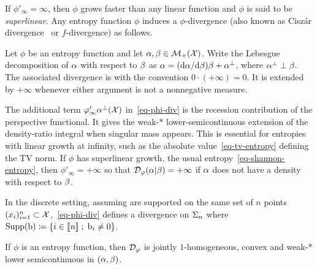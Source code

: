 If $\phi'_\infty = \infty$, then $\phi$ grows faster than any linear function and $\phi$ is said to be \emph{superlinear}. Any entropy function $\phi$ induces a $\phi$-divergence (also known as Cisz\'ar divergence~\cite{ciszar1967information,ali1966general} or $f$-divergence) as follows.

\begin{defn}
\label{def_divergence}
Let $\phi$ be an entropy function and let $\alpha,\beta\in\mathcal{M}_+(\mathcal{X})$. Write the Lebesgue decomposition of $\alpha$ with respect to $\beta$ as
$\alpha=(\mathrm{d}\alpha/\mathrm{d}\beta)\beta+\alpha^\perp$, where $\alpha^\perp\perp\beta$. The associated divergence is
with the convention $0\cdot(+\infty)=0$. It is extended by $+\infty$ whenever either argument is not a nonnegative measure.
\end{defn}%

The additional term $\varphi'_\infty \alpha^{\perp}(\mathcal{X})$ in~\eqref{eq-phi-div} is the recession contribution of the perspective functional. It gives the weak-* lower-semicontinuous extension of the density-ratio integral when singular mass appears. This is essential for entropies with linear growth at infinity, such as the absolute value~\eqref{eq-tv-entropy} defining the TV norm. If $\phi$ has superlinear growth, \eg the usual entropy~\eqref{eq-shannon-entropy}, then $\phi'_\infty=+\infty$ so that $\mathcal{D}_\varphi (\alpha|\beta) = +\infty$ if $\alpha$ does not have a density with respect to $\beta$.

In the discrete setting, assuming
are supported on the same set of $n$ points $(x_i)_{i=1}^n \subset \mathcal{X}$,~\eqref{eq-phi-div} defines a divergence on $\Sigma_n$
where $\operatorname{Supp}(\mathrm{b}) \coloneqq \left\{ i \in \llbracket n\rrbracket \;;\;  \mathrm{b}_i \neq 0  \right\}$.


\begin{proposition}\label{prop-basic-phi-divergence-properties}
If $\phi$ is an entropy function, then $\mathcal{D}_\varphi$ is jointly $1$-homogeneous, convex and weak-* lower semicontinuous in $(\alpha,\beta)$.
\end{proposition}

